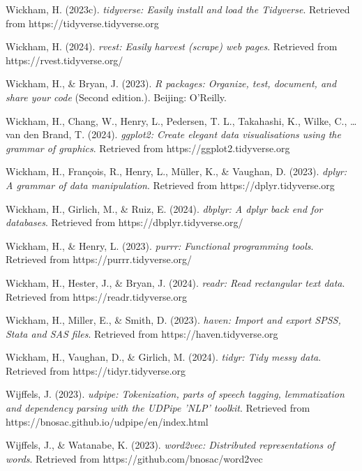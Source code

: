 \documentclass[
  letterpaper,
  krantz1]{latex/krantz-mod}
\newlength{\cslhangindent}
\newenvironment{CSLReferences}[2] %
 {\begin{list}{}{%
  \setlength{\itemindent}{0pt}
  \setlength{\leftmargin}{0pt}
  \setlength{\parsep}{0pt}
  \ifodd #1
   \setlength{\leftmargin}{\cslhangindent}
   \setlength{\itemindent}{-1\cslhangindent}
  \fi
  \setlength{\itemsep}{#2\baselineskip}}}
 {\end{list}}
\theoremstyle{definition}
\theoremstyle{definition}
\theoremstyle{remark}
\begin{document}
\begin{CSLReferences}{1}{0}
Wickham, H. (2023c). \emph{{tidyverse}: Easily install and load the
{Tidyverse}}. Retrieved from https://tidyverse.tidyverse.org

Wickham, H. (2024). \emph{{rvest}: Easily harvest (scrape) web pages}.
Retrieved from https://rvest.tidyverse.org/

Wickham, H., \& Bryan, J. (2023). \emph{R packages: Organize, test,
document, and share your code} (Second edition.). Beijing: O'Reilly.

Wickham, H., Chang, W., Henry, L., Pedersen, T. L., Takahashi, K.,
Wilke, C., \ldots{} van den Brand, T. (2024). \emph{{ggplot2}: Create
elegant data visualisations using the grammar of graphics}. Retrieved
from https://ggplot2.tidyverse.org

Wickham, H., François, R., Henry, L., Müller, K., \& Vaughan, D. (2023).
\emph{{dplyr}: A grammar of data manipulation}. Retrieved from
https://dplyr.tidyverse.org

Wickham, H., Girlich, M., \& Ruiz, E. (2024). \emph{{dbplyr}: A dplyr
back end for databases}. Retrieved from https://dbplyr.tidyverse.org/

Wickham, H., \& Henry, L. (2023). \emph{{purrr}: Functional programming
tools}. Retrieved from https://purrr.tidyverse.org/

Wickham, H., Hester, J., \& Bryan, J. (2024). \emph{{readr}: Read
rectangular text data}. Retrieved from https://readr.tidyverse.org

Wickham, H., Miller, E., \& Smith, D. (2023). \emph{{haven}: Import and
export {SPSS}, {Stata} and {SAS} files}. Retrieved from
https://haven.tidyverse.org

Wickham, H., Vaughan, D., \& Girlich, M. (2024). \emph{{tidyr}: Tidy
messy data}. Retrieved from https://tidyr.tidyverse.org

Wijffels, J. (2023). \emph{{udpipe}: Tokenization, parts of speech
tagging, lemmatization and dependency parsing with the {UDPipe} 'NLP'
toolkit}. Retrieved from https://bnosac.github.io/udpipe/en/index.html

Wijffels, J., \& Watanabe, K. (2023). \emph{{word2vec}: Distributed
representations of words}. Retrieved from
https://github.com/bnosac/word2vec


\end{CSLReferences}
\end{document}
